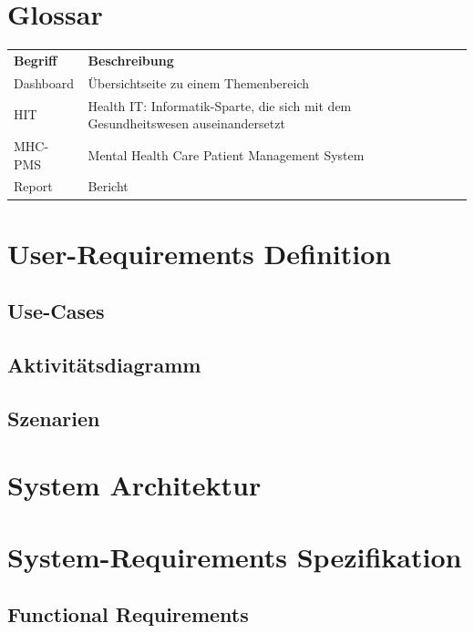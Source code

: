 \documentclass[a4paper]{scrreprt}
\begin{document}
\chapter{Glossar}
\begin{table}[h]
\label{tab_glossar}
\begin{tabular}{llll}
{\bf Begriff} 		& {\bf Beschreibung} \\
Dashboard			& Übersichtseite zu einem Themenbereich \\

HIT 				& Health IT: Informatik-Sparte, die sich mit dem Gesundheitswesen auseinandersetzt \\

MHC-PMS 			& Mental Health Care Patient Management System \\
Report				& Bericht


\end{tabular}
\end{table}


\chapter{User-Requirements Definition}

\section{Use-Cases}



\section{Aktivitätsdiagramm}


\section{Szenarien}





\chapter{System Architektur}




\chapter{System-Requirements Spezifikation}

\section{Functional Requirements}
\end{document}
